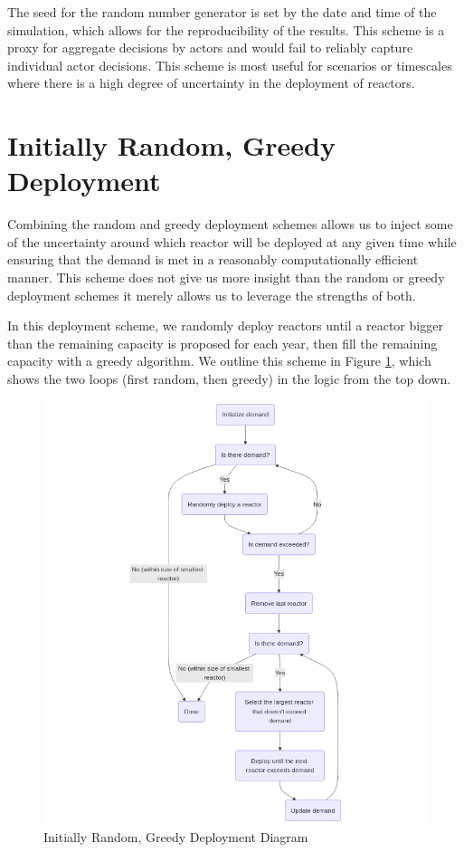 The seed for the random number generator is set by the date and time of the
simulation, which allows for the reproducibility of the results. This scheme is
a proxy for aggregate decisions by actors and would fail to reliably capture
individual actor decisions. This scheme is most useful for scenarios or
timescales where there is a high degree of uncertainty in the deployment of
reactors.


\section{Initially Random, Greedy Deployment}
\label{sec:initially_random_greedy}

Combining the random and greedy deployment schemes allows us to inject some of
the uncertainty around which reactor will be deployed at any given time while
ensuring that the demand is met in a reasonably computationally efficient
manner. This scheme does not give us more insight than the random or greedy
deployment schemes it merely allows us to leverage the strengths of both.

In this deployment scheme, we randomly deploy reactors until a reactor bigger
than the remaining capacity is proposed for each year, then fill the remaining
capacity with a greedy algorithm. We outline this scheme in Figure
\ref{fig:init_random_greedy_diagram}, which shows the two loops (first random,
then greedy) in the logic from the top down.

\begin{figure}[!htbp]
    \centering
    \includegraphics[scale=0.7]{images/schemes/random_greedy_diagram.png}
    \caption{Initially Random, Greedy Deployment Diagram}
    \label{fig:init_random_greedy_diagram}
\end{figure}

